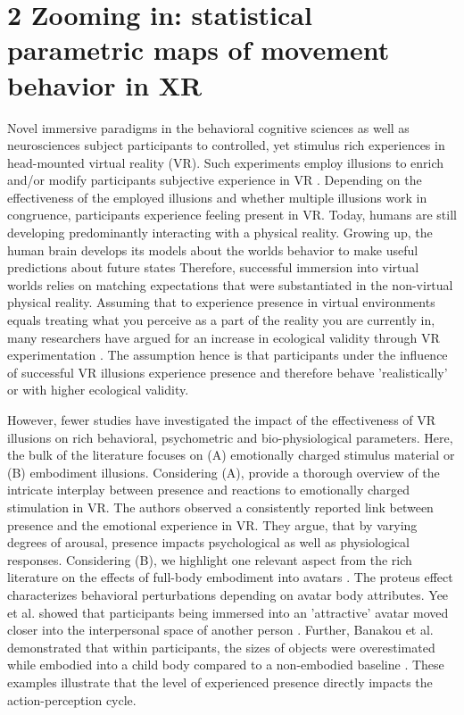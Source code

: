 \section{2 Zooming in: statistical parametric maps of movement behavior in XR}
Novel immersive paradigms in the behavioral cognitive sciences as well as neurosciences subject participants to controlled, yet stimulus rich experiences in head-mounted virtual reality (VR). Such experiments employ illusions to enrich and/or modify participants subjective experience in VR \cite{Gonzalez-Franco2017}. Depending on the effectiveness of the employed illusions and whether multiple illusions work in congruence, participants experience feeling present in VR. Today, humans are still developing predominantly interacting with a physical reality. Growing up, the human brain develops its models about the worlds behavior to make useful predictions about future states \cite{} %
Therefore, successful immersion into virtual worlds relies on matching expectations that were substantiated in the non-virtual physical reality. Assuming that to experience presence in virtual environments equals treating what you perceive as a part of the reality you are currently in, many researchers have argued for an increase in ecological validity through VR experimentation \cite{Bohil2011, Parsons2015, Parsons2017}. The assumption hence is that participants under the influence of successful VR illusions experience presence and therefore behave 'realistically' or with higher ecological validity.

However, fewer studies have investigated the impact of the effectiveness of VR illusions on rich behavioral, psychometric and bio-physiological parameters. Here, the bulk of the literature focuses on (A) emotionally charged stimulus material or (B) embodiment illusions. Considering (A), \cite{Diemer2015} provide a thorough overview of the intricate interplay between presence and reactions to emotionally charged stimulation in VR. The authors observed a consistently reported link between presence and the emotional experience in VR. They argue, that by varying degrees of arousal, presence impacts psychological as well as physiological responses. Considering (B), we highlight one relevant aspect from the rich literature on the effects of full-body embodiment into avatars \cite{Maister2015}. The proteus effect characterizes behavioral perturbations depending on avatar body attributes. Yee et al. showed that participants being immersed into an 'attractive' avatar moved closer into the interpersonal space of another person \cite{Yee2007}. Further, Banakou et al. demonstrated that within participants, the sizes of objects were overestimated while embodied into a child body compared to a non-embodied baseline \cite{Banakou2013}. These examples illustrate that the level of experienced presence directly impacts the action-perception cycle.

